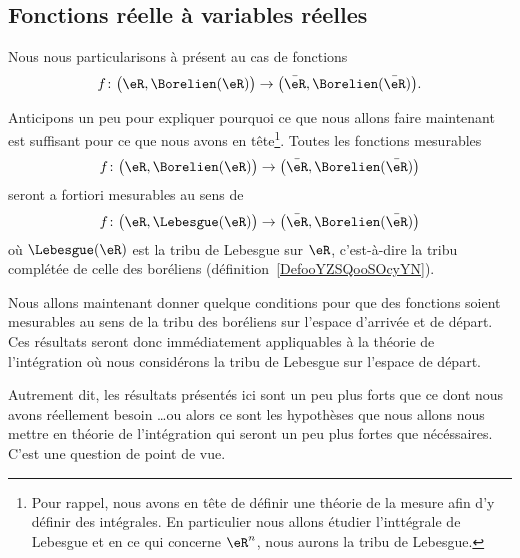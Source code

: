 \subsection{Fonctions réelle à variables réelles}

Nous nous particularisons à présent au cas de fonctions
\begin{equation}
    f\colon \big( \eR,\Borelien(\eR) \big)\to \big( \bar\eR,\Borelien(\bar \eR) \big).
\end{equation}

\begin{normaltext}      \label{NORMooNFOMooYnaflN}
    Anticipons un peu pour expliquer pourquoi ce que nous allons faire maintenant est suffisant pour ce que nous avons en tête\footnote{Pour rappel, nous avons en tête de définir une théorie de la mesure afin d'y définir des intégrales. En particulier nous allons étudier l'inttégrale de Lebesgue et en ce qui concerne \( \eR^n\), nous aurons la tribu de Lebesgue.}. Toutes les fonctions mesurables 
    \begin{equation}
        f\colon \big( \eR,\Borelien(\eR) \big)\to \big( \bar\eR,\Borelien(\bar \eR) \big)
    \end{equation}
    seront a fortiori mesurables au sens de 
    \begin{equation}
        f\colon \big( \eR,\Lebesgue(\eR) \big)\to \big( \bar\eR,\Borelien(\bar \eR) \big)
    \end{equation}
    où \( \Lebesgue(\eR)\) est la tribu de Lebesgue sur \( \eR\), c'est-à-dire la tribu complétée de celle des boréliens (définition~\ref{DefooYZSQooSOcyYN}).
\end{normaltext}

\begin{normaltext}      
    Nous allons maintenant donner quelque conditions pour que des fonctions soient mesurables au sens de la tribu des boréliens sur l'espace d'arrivée et de départ. Ces résultats seront donc immédiatement appliquables à la théorie de l'intégration où nous considérons la tribu de Lebesgue sur l'espace de départ.

    Autrement dit, les résultats présentés ici sont un peu plus forts que ce dont nous avons réellement besoin \ldots ou alors ce sont les hypothèses que nous allons nous mettre en théorie de l'intégration qui seront un peu plus fortes que nécéssaires. C'est une question de point de vue.
\end{normaltext}

